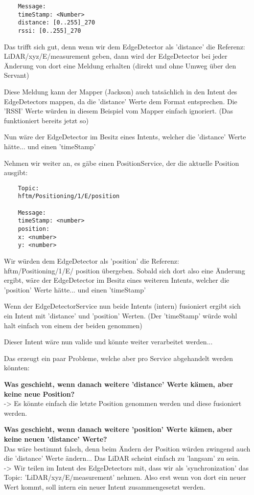 \begin{formal}
\begin{verbatim}
	Message:
	timeStamp: <Number>
	distance: [0..255]_270
	rssi: [0..255]_270
	\end{verbatim}
	
	Das trifft sich gut, denn wenn wir dem EdgeDetector als 'distance' die Referenz: LiDAR/xyz/E/measurement geben, dann wird der EdgeDetector bei jeder Änderung von dort eine Meldung erhalten (direkt und ohne Umweg über den Servant)
	
	Diese Meldung kann der Mapper (Jackson) auch tatsächlich in den Intent des EdgeDetectors mappen, da die 'distance' Werte dem Format entsprechen. Die 'RSSI' Werte würden in diesem Beispiel vom Mapper einfach ignoriert. (Das funktioniert bereits jetzt so)
	
	Nun wäre der EdgeDetector im Besitz eines Intents, welcher die 'distance' Werte hätte... und einen 'timeStamp'
	
	Nehmen wir weiter an, es gäbe einen PositionService, der die aktuelle Position ausgibt:
	\begin{verbatim}
	Topic:
	hftm/Positioning/1/E/position
	
	Message:
	timeStamp: <number>
	position:
	x: <number>
	y: <number>
	\end{verbatim}
	
	Wir würden dem EdgeDetector als 'position' die Referenz: hftm/Positioning/1/E/ position übergeben. Sobald sich dort also eine Änderung ergibt, wäre der EdgeDetector im Besitz eines weiteren Intents, welcher die 'position' Werte hätte... und einen 'timeStamp'
	
	Wenn der EdgeDetectorService nun beide Intents (intern) fusioniert ergibt sich ein Intent mit 'distance' und 'position' Werten. (Der 'timeStamp' würde wohl halt einfach von einem der beiden genommen)
	
	Dieser Intent wäre nun valide und könnte weiter verarbeitet werden...
	
	
	Das erzeugt ein paar Probleme, welche aber pro Service abgehandelt werden könnten:
	
	\textbf{Was geschieht, wenn danach weitere 'distance' Werte kämen, aber keine neue Position?}\\
	-> Es könnte einfach die letzte Position genommen werden und diese fusioniert werden.
	
	\textbf{Was geschieht, wenn danach weitere 'position' Werte kämen, aber keine neuen 'distance' Werte?}\\
	Das wäre bestimmt falsch, denn beim Ändern der Position würden zwingend auch die 'distance' Werte ändern... Das LiDAR scheint einfach zu 'langsam' zu sein.\\
	-> Wir teilen im Intent des EdgeDetectors mit, dass wir als 'synchronization' das Topic: 'LiDAR/xyz/E/measurement' nehmen. Also erst wenn von dort ein neuer Wert kommt, soll intern ein neuer Intent zusammengesetzt werden.
	

\end{formal}
